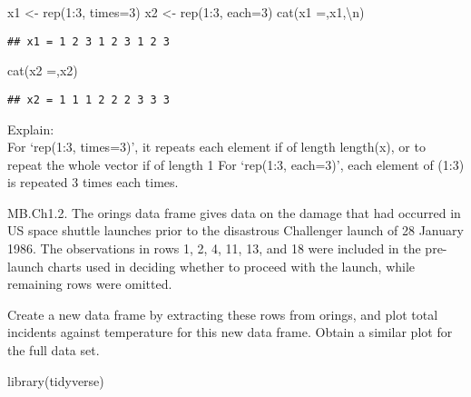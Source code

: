 \documentclass[
]{article}
\newenvironment{Shaded}{\begin{snugshade}}{\end{snugshade}}
\newcommand{\AttributeTok}[1]{\textcolor[rgb]{0.77,0.63,0.00}{#1}}
\newcommand{\DecValTok}[1]{\textcolor[rgb]{0.00,0.00,0.81}{#1}}
\newcommand{\FunctionTok}[1]{\textcolor[rgb]{0.00,0.00,0.00}{#1}}
\newcommand{\NormalTok}[1]{#1}
\newcommand{\OtherTok}[1]{\textcolor[rgb]{0.56,0.35,0.01}{#1}}
\newcommand{\SpecialCharTok}[1]{\textcolor[rgb]{0.00,0.00,0.00}{#1}}
\newcommand{\StringTok}[1]{\textcolor[rgb]{0.31,0.60,0.02}{#1}}
\begin{document}
\begin{Shaded}
\begin{Highlighting}[]
\NormalTok{x1 }\OtherTok{\textless{}{-}} \FunctionTok{rep}\NormalTok{(}\DecValTok{1}\SpecialCharTok{:}\DecValTok{3}\NormalTok{, }\AttributeTok{times=}\DecValTok{3}\NormalTok{)}
\NormalTok{x2 }\OtherTok{\textless{}{-}} \FunctionTok{rep}\NormalTok{(}\DecValTok{1}\SpecialCharTok{:}\DecValTok{3}\NormalTok{, }\AttributeTok{each=}\DecValTok{3}\NormalTok{)}
\FunctionTok{cat}\NormalTok{(}\StringTok{\textquotesingle{}x1 =\textquotesingle{}}\NormalTok{,x1,}\StringTok{\textquotesingle{}}\SpecialCharTok{\textbackslash{}n}\StringTok{\textquotesingle{}}\NormalTok{)}
\end{Highlighting}
\end{Shaded}

\begin{verbatim}
## x1 = 1 2 3 1 2 3 1 2 3
\end{verbatim}

\begin{Shaded}
\begin{Highlighting}[]
\FunctionTok{cat}\NormalTok{(}\StringTok{\textquotesingle{}x2 =\textquotesingle{}}\NormalTok{,x2)}
\end{Highlighting}
\end{Shaded}

\begin{verbatim}
## x2 = 1 1 1 2 2 2 3 3 3
\end{verbatim}

Explain:\\
For `rep(1:3, times=3)', it repeats each element if of length length(x),
or to repeat the whole vector if of length 1 For `rep(1:3, each=3)',
each element of (1:3) is repeated 3 times each times.

MB.Ch1.2. The orings data frame gives data on the damage that had
occurred in US space shuttle launches prior to the disastrous Challenger
launch of 28 January 1986. The observations in rows 1, 2, 4, 11, 13, and
18 were included in the pre-launch charts used in deciding whether to
proceed with the launch, while remaining rows were omitted.

Create a new data frame by extracting these rows from orings, and plot
total incidents against temperature for this new data frame. Obtain a
similar plot for the full data set.

\begin{Shaded}
\begin{Highlighting}[]
\FunctionTok{library}\NormalTok{(tidyverse)}
\end{Highlighting}
\end{Shaded}
\end{document}

